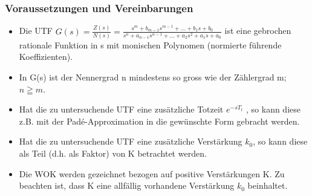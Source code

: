 \subsubsection{Voraussetzungen und Vereinbarungen }
\begin{itemize}
\item  Die UTF $G(s)=\frac{Z(s)}{N(s)}=\frac{s^m + b_{m-1}s^{m-1}+ ... + b_{1}s+b_{0}}{s^{n}+a_{n-1}s^{n-1} + ... + a_{2}s^{2}+a_{1}s + a_{0}}$
ist eine gebrochen rationale
Funktion in s mit monischen Polynomen (normierte führende Koeffizienten).
\item  In G(s) ist der Nennergrad n mindestens so gross wie der Zählergrad m; $n \geqq m$.
\item  Hat die zu untersuchende UTF eine zusätzliche Totzeit $e^{-sT_t}$ , so kann diese
z.B. mit der Padé-Approximation in die gewünschte Form gebracht werden.
\item  Hat die zu untersuchende UTF eine zusätzliche Verstärkung $k_0$, so kann diese
als Teil (d.h. als Faktor) von K betrachtet werden.
\item  Die WOK werden gezeichnet bezogen auf positive Verstärkungen K. Zu beachten
ist, dass K eine allfällig vorhandene Verstärkung $k_0$ beinhaltet.
\end{itemize}

\clearpage
